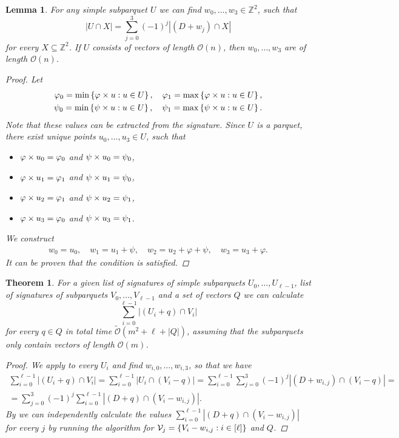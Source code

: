 \documentclass[11pt]{article}
\newcommand{\Z}{\mathbb{Z}}
\renewcommand{\O}{\mathcal{O}}
\newcommand{\tO}{\tilde{\mathcal{O}}}
\renewcommand{\phi}{\varphi}
\newcommand{\set}[1]{\left\lbrace #1 \right\rbrace}
\newcommand{\eq}[1]{\begin{align*} #1 \end{align*}}
\theoremstyle{plain}
\newtheorem{theorem}{Theorem}
\newtheorem{lemma}{Lemma}
\theoremstyle{definition}
\theoremstyle{remark}
\begin{document}
\begin{lemma}\label{primitive}
	For any simple subparquet $U$ we can find $w_0, \dots, w_3 \in \Z^2$, such that
	\[ |U \cap X| = \sum_{j = 0}^3 (-1)^j |(D + w_j) \cap X|\]
	for every $X \subseteq \Z^2$.
	If $U$ consists of vectors of length $\O(n)$, then $w_0, \dots, w_3$ are of length $\O(n)$.
	\begin{proof}
		Let \eq{
			\phi_0 = \min\set{{\h{u} : u \in U}}, \quad 
			\phi_1 = \max\set{{\h{u} : u \in U}},\\
			\psi_0 = \min\set{{\s{u} : u \in U}}, \quad
			\psi_1 = \max\set{{\s{u} : u \in U}}.
		}
		Note that these values can be extracted from the signature.
		Since $U$ is a parquet, there exist unique points $u_0, \dots, u_3 \in U$, such that
		\begin{itemize}
			\item $\h{u_0} = \phi_0$ and $\psi \times u_0 = \psi_0$,
			\item $\h{u_1} = \phi_1$ and $\psi \times u_1 = \psi_0$,
			\item $\h{u_2} = \phi_1$ and $\psi \times u_2 = \psi_1$,
			\item $\h{u_3} = \phi_0$ and $\psi \times u_3 = \psi_1$.
		\end{itemize}
		We construct \eq{
			w_0 = u_0, \quad 
			w_1 = u_1 + \psi, \quad
			w_2 = u_2 + \phi + \psi, \quad
			w_3 = u_3 + \phi.
		}
		It can be proven that the condition is satisfied.
	\end{proof}
\end{lemma}

\begin{theorem}\label{subparquet_convolution}
	For a given list of signatures of simple subparquets $U_0, \dots, U_{\ell - 1}$, list of signatures of subparquets $V_0, \dots, V_{\ell - 1}$ and a set of vectors $Q$ we can calculate
	\[ \sum_{i = 0}^{\ell - 1} |(U_i + q) \cap V_i| \]
	for every $q \in Q$ in total time $\tO(m^2 + \ell + |Q|)$, assuming that the subparquets only contain vectors of length $\O(m)$.
	\begin{proof}
		We apply  to every $U_i$ and find $w_{i, 0}, \dots, w_{i, 3}$, so that we have
		\eq{
			\sum_{i = 0}^{\ell - 1}|(U_i + q) \cap V_i| 
			= \sum_{i = 0}^{\ell - 1}|U_i \cap (V_i - q)| 
			= \sum_{i = 0}^{\ell - 1} \sum_{j = 0}^3 (-1)^j |(D + w_{i, j}) \cap (V_i - q)| = \\
			= \sum_{j = 0}^3 (-1)^j \sum_{i = 0}^{\ell - 1} |(D + q) \cap (V_i - w_{i, j})|.
		}
		By  we can independently calculate the values $\sum_{i = 0}^{\ell - 1} |(D + q) \cap (V_i - w_{i, j})|$ for every $j$ by running the algorithm for $\V_j = \set{V_i - w_{i, j} : i \in [\ell]}$ and $Q$.
	\end{proof}
\end{theorem}
\end{document}
